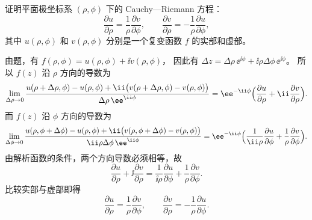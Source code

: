 \begin{question}
证明平面极坐标系 \((\rho,\phi)\) 下的 Cauchy—Riemann 方程：
\[
\frac{\partial u}{\partial\rho}=\frac{1}{\rho}\frac{\partial v}{\partial\phi},\qquad
\frac{\partial v}{\partial\rho}=-\frac{1}{\rho}\frac{\partial u}{\partial\phi},
\]
其中 \(u(\rho,\phi)\) 和 \(v(\rho,\phi)\) 分别是一个复变函数 \(f\) 的实部和虚部。
\begin{solution}
由题，有 \(f(\rho,\phi)=u(\rho,\phi)+\ii v(\rho,\phi)\)，
因此有 \(\Delta z=\Delta\rho\,\ee^{\ii\phi}+\ii\rho\Delta\phi\,\ee^{\ii\phi}\)。
所以 \(f(z)\) 沿 \(\rho\) 方向的导数为
\[
\lim_{\Delta\rho\to0}
\frac{u(\rho+\Delta\rho,\phi)-u(\rho,\phi)
+\ii\bigl(v(\rho+\Delta\rho,\phi)-v(\rho,\phi)\bigr)}
{\Delta\rho\,\ee^{\ii\phi}}
=\ee^{-\ii\phi}\Bigl(\frac{\partial u}{\partial\rho}+\ii\frac{\partial v}{\partial\rho}\Bigr).
\]
而 \(f(z)\) 沿 \(\phi\) 方向的导数为
\[
\lim_{\Delta\phi\to0}
\frac{u(\rho,\phi+\Delta\phi)-u(\rho,\phi)
+\ii\bigl(v(\rho,\phi+\Delta\phi)-v(\rho,\phi)\bigr)}
{\ii\rho\Delta\phi\,\ee^{\ii\phi}}
=\ee^{-\ii\phi}\Bigl(\frac{1}{\ii\rho}\frac{\partial u}{\partial\phi}
+\frac{1}{\rho}\frac{\partial v}{\partial\phi}\Bigr).
\]
由解析函数的条件，两个方向导数必须相等，故
\[
\frac{\partial u}{\partial\rho}+\ii\frac{\partial v}{\partial\rho}
=\frac{1}{\ii\rho}\frac{\partial u}{\partial\phi}+\frac{1}{\rho}\frac{\partial v}{\partial\phi}.
\]
比较实部与虚部即得
\[
\frac{\partial u}{\partial\rho}=\frac{1}{\rho}\frac{\partial v}{\partial\phi},\qquad
\frac{\partial v}{\partial\rho}=-\frac{1}{\rho}\frac{\partial u}{\partial\phi}.
\]
\end{solution}
\end{question}

